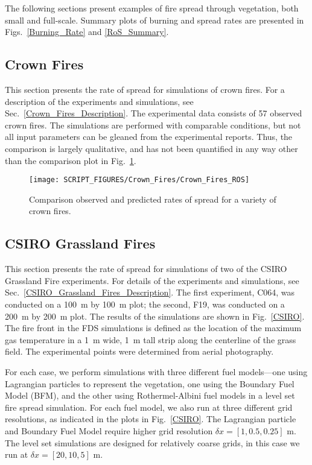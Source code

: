 The following sections present examples of fire spread through vegetation, both small and full-scale. Summary plots of burning and spread rates are presented in Figs.~\ref{Burning_Rate} and \ref{RoS_Summary}.


\subsection{Crown Fires}

This section presents the rate of spread for simulations of crown fires. For a description of the experiments and simulations, see Sec.~\ref{Crown_Fires_Description}. The experimental data consists of 57 observed crown fires. The simulations are performed with comparable conditions, but not all input parameters can be gleaned from the experimental reports. Thus, the comparison is largely qualitative, and has not been quantified in any way other than the comparison plot in Fig.~\ref{Crown_Fire_Plot}.

\begin{figure}[ht]
\centering
\texttt{[image: SCRIPT\_FIGURES/Crown\_Fires/Crown\_Fires\_ROS]}
\caption[Comparison observed and predicted rates of spread for a variety of crown fires]{Comparison observed and predicted rates of spread for a variety of crown fires.}
\label{Crown_Fire_Plot}
\end{figure}


\clearpage


\subsection{CSIRO Grassland Fires}

This section presents the rate of spread for simulations of two of the CSIRO Grassland Fire experiments. For details of the experiments and simulations, see Sec.~\ref{CSIRO_Grassland_Fires_Description}. The first experiment, C064, was conducted on a 100~m by 100~m plot; the second, F19, was conducted on a 200~m by 200~m plot. The results of the simulations are shown in Fig.~\ref{CSIRO}. The fire front in the FDS simulations is defined as the location of the maximum gas temperature in a 1~m wide, 1~m tall strip along the centerline of the grass field. The experimental points were determined from aerial photography.

For each case, we perform simulations with three different fuel models---one using Lagrangian particles to represent the vegetation, one using the Boundary Fuel Model (BFM), and the other using Rothermel-Albini fuel models in a level set fire spread simulation.  For each fuel model, we also run at three different grid resolutions, as indicated in the plots in Fig.~\ref{CSIRO}.  The Lagrangian particle and Boundary Fuel Model require higher grid resolution $\delta x = [1, 0.5, 0.25]$ m.  The level set simulations are designed for relatively coarse grids, in this case we run at $\delta x = [20, 10, 5]$ m.

